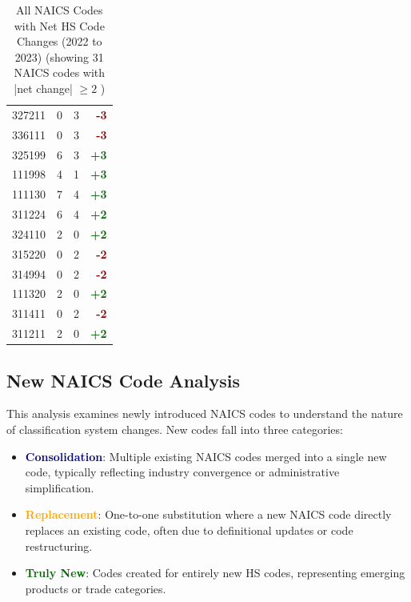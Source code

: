 \documentclass[11pt]{article}
\begin{document}
\begin{table}[H]
\begin{minipage}{0.48\textwidth}
\begin{tabular}{lrrr}
327211 & 0 & 3 & \textcolor{darkred}{\textbf{-3}} \\
336111 & 0 & 3 & \textcolor{darkred}{\textbf{-3}} \\
325199 & 6 & 3 & \textcolor{darkgreen}{\textbf{+3}} \\
111998 & 4 & 1 & \textcolor{darkgreen}{\textbf{+3}} \\
111130 & 7 & 4 & \textcolor{darkgreen}{\textbf{+3}} \\
311224 & 6 & 4 & \textcolor{darkgreen}{\textbf{+2}} \\
324110 & 2 & 0 & \textcolor{darkgreen}{\textbf{+2}} \\
315220 & 0 & 2 & \textcolor{darkred}{\textbf{-2}} \\
314994 & 0 & 2 & \textcolor{darkred}{\textbf{-2}} \\
111320 & 2 & 0 & \textcolor{darkgreen}{\textbf{+2}} \\
311411 & 0 & 2 & \textcolor{darkred}{\textbf{-2}} \\
311211 & 2 & 0 & \textcolor{darkgreen}{\textbf{+2}} \\
\bottomrule
\end{tabular}
\end{minipage}
\caption{All NAICS Codes with Net HS Code Changes (2022 to 2023) (showing 31 NAICS codes with |net change| $\geq 2$ )}
\end{table}


\subsection{New NAICS Code Analysis}

This analysis examines newly introduced NAICS codes to understand the nature of classification system changes. New codes fall into three categories:

\begin{itemize}
    \item \textcolor{darkblue}{\textbf{Consolidation}}: Multiple existing NAICS codes merged into a single new code, typically reflecting industry convergence or administrative simplification.
    \item \textcolor{orange}{\textbf{Replacement}}: One-to-one substitution where a new NAICS code directly replaces an existing code, often due to definitional updates or code restructuring.
    \item \textcolor{darkgreen}{\textbf{Truly New}}: Codes created for entirely new HS codes, representing emerging products or trade categories.
\end{itemize}
\end{document}
